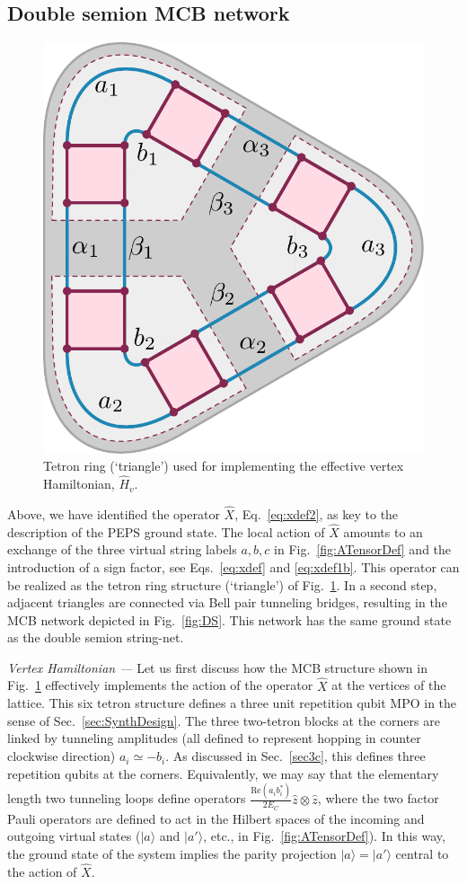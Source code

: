 \documentclass[twocolumn,floats,prx,showpacs]{revtex4-1}
\newcommand{\ket}[1]{|#1\rangle}
\begin{document}
\subsection{Double semion MCB network}\label{sec4c}

\begin{figure}
\includegraphics[width=0.5\columnwidth]{fig/triangle.pdf}
\caption{Tetron ring (`triangle') used for implementing the effective vertex Hamiltonian, $\hat H_v$.}
\label{fig:DSMPO}
\end{figure}

Above, we have identified the operator $\hat X$, Eq.~\eqref{eq:xdef2}, as key to the description of the PEPS ground state.  The local action of $\hat X$ amounts to an exchange of the three virtual string labels $a,b,c$ in Fig.~\ref{fig:ATensorDef} and the introduction of a sign factor, see Eqs.~\eqref{eq:xdef} and \eqref{eq:xdef1b}. 
This operator can be realized as the tetron ring structure (`triangle') of Fig.~\ref{fig:DSMPO}.
In a second step, adjacent triangles are connected via Bell pair tunneling bridges, resulting in the MCB network depicted in Fig.~\ref{fig:DS}.  This network has the same ground state as the double semion string-net.
 
\emph{Vertex Hamiltonian ---} Let us first discuss how the MCB structure shown in  Fig.~\ref{fig:DSMPO} effectively implements the action of the operator $\hat X$ at the vertices of the lattice. This six tetron structure defines a three unit repetition qubit MPO in the sense of Sec.~\ref{sec:SynthDesign}. The three two-tetron blocks at the corners are linked by tunneling amplitudes (all defined to represent hopping in counter clockwise direction) $a_i\simeq -b_i$. As discussed in Sec.~\ref{sec3c}, this defines three repetition qubits at the corners. Equivalently, we may say that the elementary length two tunneling loops define operators $\frac{\text{Re}\left(a_i  b_i^\ast\right)}{2 E_C} \hat z \otimes  \hat z$, where the two factor Pauli operators are defined to act in the Hilbert spaces of the incoming and outgoing virtual states ($\ket{a}$ and $\ket{a'}$, etc., in Fig.~\ref{fig:ATensorDef}). In this way, the ground state of the system implies the parity projection $\ket{a}=\ket{a'}$ central to the action of $\hat X$. 
\end{document}
